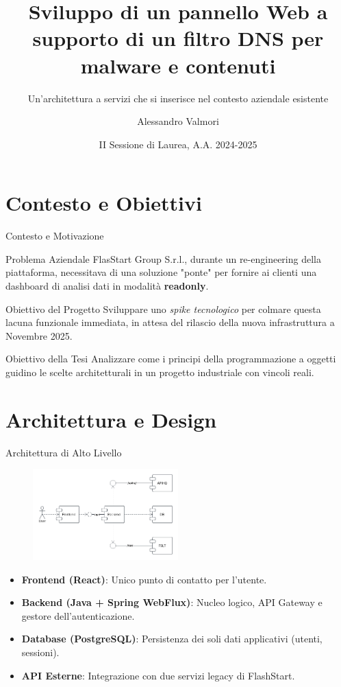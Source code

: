 \documentclass[8pt]{beamer}
\title{Sviluppo di un pannello Web a supporto di un filtro DNS per malware e contenuti}
\subtitle{Un'architettura a servizi che si inserisce nel contesto aziendale esistente}
\date{II Sessione di Laurea, A.A. 2024-2025}
\author{Alessandro Valmori}
\institute{Università di Bologna \and Relatore: Prof. Mirko Viroli \and Correlatore: Dott. Nicolas Farabegoli}
\begin{document}
\maketitle



\section{Contesto e Obiettivi}

\begin{frame}{Contesto e Motivazione}
  \begin{block}{Problema Aziendale }
    FlasStart Group S.r.l., durante un re-engineering della piattaforma, necessitava di una soluzione "ponte" per fornire ai clienti una dashboard di analisi dati in modalità \textbf{readonly}.
  \end{block}
  \begin{block}{Obiettivo del Progetto }
    Sviluppare uno \textit{spike tecnologico} per colmare questa lacuna funzionale immediata, in attesa del rilascio della nuova infrastruttura a Novembre 2025.
  \end{block}
  \begin{alertblock}{Obiettivo della Tesi }
    Analizzare come i principi della programmazione a oggetti guidino le scelte architetturali in un progetto industriale con vincoli reali.
  \end{alertblock}
\end{frame}

\section{Architettura e Design}

\begin{frame}{Architettura di Alto Livello}
  \begin{figure}
    \includegraphics[width=0.5\textwidth]{figures/components.pdf}
  \end{figure}
  \begin{itemize}
    \item \textbf{Frontend (React)}: Unico punto di contatto per l'utente.
    \item \textbf{Backend (Java + Spring WebFlux)}: Nucleo logico, API Gateway e gestore dell'autenticazione.
    \item \textbf{Database (PostgreSQL)}: Persistenza dei soli dati applicativi (utenti, sessioni).
    \item \textbf{API Esterne}: Integrazione con due servizi legacy di FlashStart.
  \end{itemize}
\end{frame}
\end{document}
